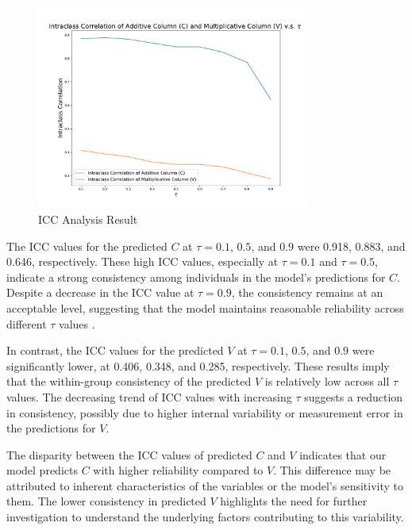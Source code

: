 \documentclass{article}
\begin{document}
\begin{figure}[H]
\centering
\includegraphics[width=0.8\textwidth]{icc_plot.pdf} 
\caption{ICC Analysis Result} 
\label{icc} 
\end{figure}

The ICC values for the predicted $C$ at $\tau = 0.1$, $0.5$, and $0.9$ were 0.918, 0.883, and 0.646, respectively. These high ICC values, especially at $\tau = 0.1$ and $\tau = 0.5$, indicate a strong consistency among individuals in the model's predictions for $C$. Despite a decrease in the ICC value at $\tau = 0.9$, the consistency remains at an acceptable level, suggesting that the model maintains reasonable reliability across different $\tau$ values \cite{donner1980estimation}.

In contrast, the ICC values for the predicted $V$ at $\tau = 0.1$, $0.5$, and $0.9$ were significantly lower, at 0.406, 0.348, and 0.285, respectively. These results imply that the within-group consistency of the predicted $V$ is relatively low across all $\tau$ values. The decreasing trend of ICC values with increasing $\tau$ suggests a reduction in consistency, possibly due to higher internal variability or measurement error in the predictions for $V$.

The disparity between the ICC values of predicted $C$ and $V$ indicates that our model predicts $C$ with higher reliability compared to $V$. This difference may be attributed to inherent characteristics of the variables or the model's sensitivity to them. The lower consistency in predicted $V$ highlights the need for further investigation to understand the underlying factors contributing to this variability.
\end{document}
